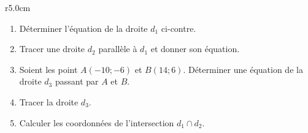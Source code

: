 
\begin{exercice}\label{exosmath-0606}

\begin{wrapfigure}{r}{5.0cm}
   \vspace{-0.5cm}        %
   \centering
   
\end{wrapfigure}

\begin{enumerate}
    \item
        Déterminer l'équation de la droite \( d_1\) ci-contre.
    \item
        Tracer une droite \( d_2\) parallèle à \( d_1\) et donner son équation.
    \item
        Soient les point \( A(-10;-6)\) et \( B(14;6)\). Déterminer une équation de la droite \( d_3\) passant par \( A\) et \( B\).
    \item
        Tracer la droite \( d_3\).
    \item
        Calculer les coordonnées de l'intersection \( d_1\cap d_2\).
\end{enumerate}


\end{exercice}
